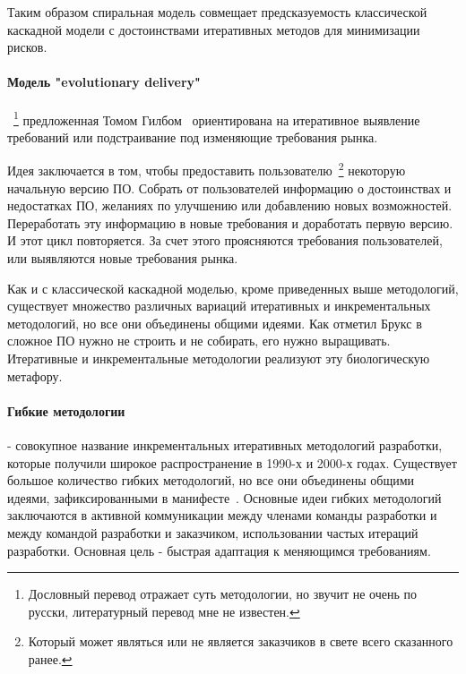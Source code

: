 Таким образом спиральная модель совмещает предсказуемость классической каскадной модели с достоинствами итеративных методов для минимизации рисков.

\paragraph{Модель "evolutionary delivery"}~\footnote{Дословный перевод отражает суть методологии, но звучит не очень по русски, литературный перевод мне не известен.} предложенная Томом Гилбом~\cite{Gilb:1985:EDV} ориентирована на итеративное выявление требований или подстраивание под изменяющие требования рынка.

Идея заключается в том, чтобы предоставить пользователю~\footnote{Который может являться или не является заказчиков в свете всего сказанного ранее.} некоторую начальную версию ПО. Собрать от пользователей информацию о достоинствах и недостатках ПО, желаниях по улучшению или добавлению новых возможностей. Переработать эту информацию в новые требования и доработать первую версию. И этот цикл повторяется. За счет этого проясняются требования пользователей, или выявляются новые требования рынка.

Как и с классической каскадной моделью, кроме приведенных выше методологий, существует множество различных вариаций итеративных и инкрементальных методологий, но все они объединены общими идеями. Как отметил Брукс в~\cite{Brooks:1987:NSB} сложное ПО нужно не строить и не собирать, его нужно выращивать. Итеративные и инкрементальные методологии реализуют эту биологическую метафору.

\paragraph{Гибкие методологии} - совокупное название инкрементальных итеративных методологий разработки, которые получили широкое распространение в 1990-х и 2000-х годах. Существует большое количество гибких методологий, но все они объединены общими идеями, зафиксированными в манифесте~\cite{Agile}. Основные идеи гибких методологий заключаются в активной коммуникации между членами команды разработки и между командой разработки и заказчиком, использовании частых итераций разработки. Основная цель - быстрая адаптация к меняющимся требованиям.

